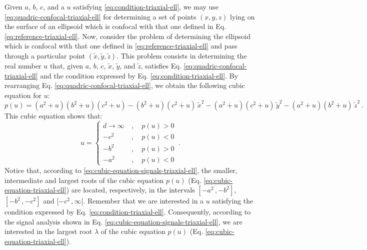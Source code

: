 \documentclass[gmd, manuscript]{copernicus}
\begin{document}
Given $a$, $b$, $c$, and a $u$ satisfying \ref{eq:condition-triaxial-ell},
we may use \ref{eq:quadric-confocal-triaxial-ell} for determining a set of
points $(x, y, z)$ lying on the surface of an ellipsoid which is confocal
with that one defined in Eq. \ref{eq:reference-triaxial-ell}.
Now, consider the problem of determining the ellipsoid which is confocal
with that one defined in \ref{eq:reference-triaxial-ell} and pass through
a particular point $(\tilde{x}, \tilde{y}, \tilde{z})$.
This problem consists in determining the real number $u$ that,
given $a$, $b$, $c$, $\tilde{x}$, $\tilde{y}$, and $\tilde{z}$,
satisfies Eq. \ref{eq:quadric-confocal-triaxial-ell} and
the condition expressed by Eq. \ref{eq:condition-triaxial-ell}.
By rearranging Eq. \ref{eq:quadric-confocal-triaxial-ell},
we obtain the following cubic equation for $u$:
\begin{equation}
p(u) = (a^{2} + u)(b^{2} + u)(c^{2} + u) - (b^{2} + u)(c^{2} + u) \, \tilde{x}^{2}
- (a^{2} + u)(c^{2} + u) \, \tilde{y}^{2} - (a^{2} + u)(b^{2} + u) \, \tilde{z}^{2} \: .
\label{eq:cubic-equation-triaxial-ell}
\end{equation}
This cubic equation shows that:
\begin{equation}
u = \begin{cases}
d \to \infty \: &, \quad p(u) > 0 \\
-c^{2} \: &, \quad p(u) < 0 \\
-b^{2} \: &, \quad p(u) > 0 \\
-a^{2} \: &, \quad p(u) < 0
\end{cases} \: .
\label{eq:cubic-equation-signals-triaxial-ell}
\end{equation}
Notice that, according to \ref{eq:cubic-equation-signals-triaxial-ell},
the smaller, intermediate and largest roots of the cubic
equation $p(u)$ (Eq. \ref{eq:cubic-equation-triaxial-ell}) are
located, respectively, in the intervals $[ -a^{2} \, , -b^{2} ]$,
$[ -b^{2} \, , -c^{2} ]$ and $[ -c^{2} \, , \infty [$.
Remember that we are interested in a $u$ satisfying
the condition expressed by Eq. \ref{eq:condition-triaxial-ell}.
Consequently, according to the signal analysis shown in Eq.
\ref{eq:cubic-equation-signals-triaxial-ell}, we are interested in
the largest root $\lambda$ of the cubic equation $p(u)$ (Eq.
\ref{eq:cubic-equation-triaxial-ell}).
\end{document}
